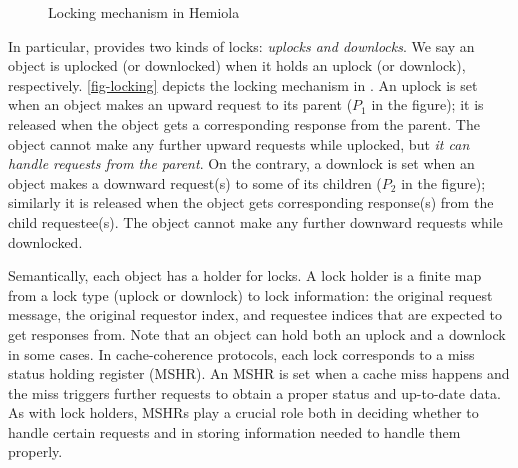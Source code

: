 \documentclass[sigplan,10pt,review,anonymous,screen]{acmart}\settopmatter{printfolios=true,printccs=false,printacmref=false}
\begin{document}
\begin{figure}[h]
  \caption{Locking mechanism in Hemiola}
  \label{fig-locking}
\end{figure}

In particular, \hemiola{} provides two kinds of locks: \emph{uplocks and downlocks}.
We say an object is uplocked (or downlocked) when it holds an uplock (or downlock), respectively.
\autoref{fig-locking} depicts the locking mechanism in \hemiola{}.
An uplock is set when an object makes an upward request to its parent ($P_1$ in the figure); it is released when the object gets a corresponding response from the parent.
The object cannot make any further upward requests while uplocked, but \emph{it can handle requests from the parent}.
On the contrary, a downlock is set when an object makes a downward request(s) to some of its children ($P_2$ in the figure); similarly it is released when the object gets corresponding response(s) from the child requestee(s).
The object cannot make any further downward requests while downlocked.

Semantically, each object has a holder for locks.
A lock holder is a finite map from a lock type (uplock or downlock) to lock information: the original request message, the original requestor index, and requestee indices that are expected to get responses from.
Note that an object can hold both an uplock and a downlock in some cases.
In cache-coherence protocols, each lock corresponds to a miss status holding register (MSHR).
An MSHR is set when a cache miss happens and the miss triggers further requests to obtain a proper status and up-to-date data.
As with \hemiola{} lock holders, MSHRs play a crucial role both in deciding whether to handle certain requests and in storing information needed to handle them properly.
\end{document}
